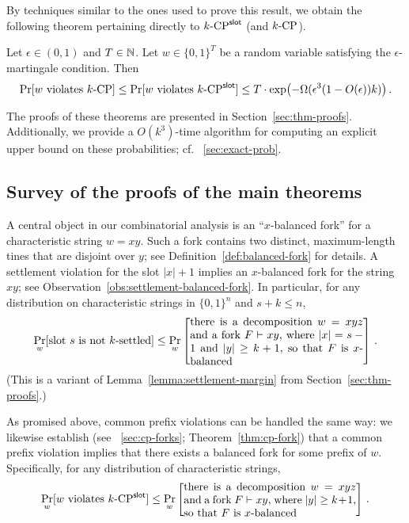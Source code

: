 By techniques similar to the ones used to prove this result, 
we obtain the following theorem pertaining
directly to ${k}\text{-}\mathrm{CP}^{\mathsf{slot}}$ (and ${k}\text{-}\mathrm{CP}$).
\begin{theorem} \label{thm:main-CP} Let
  $\epsilon \in (0,1)$ and $T \in \mathbb{N}$. Let $w \in \{0,1\}^T$ be a
  random variable satisfying the $\epsilon$-martingale condition.
  Then
  \[
    \Pr[\text{$w$ violates ${k}\text{-}\mathrm{CP}$}] 
      \leq \Pr[\text{$w$ violates ${k}\text{-}\mathrm{CP}^{\mathsf{slot}}$}] 
      \leq T \cdot \exp\bigl(-\Omega(\epsilon^3 (1 - O(\epsilon))k)\bigr)
      \,.
  \]
\end{theorem}
The proofs of these theorems are presented in Section~\ref{sec:thm-proofs}.
Additionally, we provide a $O(k^3)$-time algorithm for 
computing an explicit upper bound on these probabilities; cf. \Section~\ref{sec:exact-prob}.


\subsection{Survey of the proofs of the main theorems}\label{sec:args-survey}
A central object in our combinatorial analysis is an ``$x$-balanced fork'' 
for a characteristic string $w = xy$. 
Such a fork contains two distinct, %
maximum-length tines 
that are disjoint over $y$; 
see Definition~\ref{def:balanced-fork} for details. 
A settlement violation for the slot $|x| + 1$ implies an $x$-balanced fork for the string $xy$; 
see Observation~\ref{obs:settlement-balanced-fork}. 
In particular, for any distribution on characteristic strings in $\{0,1\}^n$ and
$s + k \leq n$,
\[
  \Pr_{w}[\text{slot $s$ is not $k$-settled} ] 
    \leq
    \Pr_w\left[\parbox{55mm}{
      there is a decomposition $w = xyz$ and a fork $F \Fork xy$, 
      where $|x| = s - 1$ and $|y| \geq k + 1$, 
      so that $F$ is $x$-balanced
    }\right] 
    \,.
\]
(This is a variant of Lemma~\ref{lemma:settlement-margin} from Section~\ref{sec:thm-proofs}.)

As promised above, common prefix violations can be handled the same
way: we likewise establish (see \Section~\ref{sec:cp-forks}; Theorem~\ref{thm:cp-fork}) that a common
prefix violation implies that there exists a balanced fork for some prefix of
$w$.  Specifically, for any distribution of characteristic strings, 
\begin{equation}\label{eq:pr-cp-fork}
  \Pr_w[\text{$w$ violates $\kSlotCP$}] 
    \leq 
    \Pr_{w}\left[\parbox{55mm}{
      there is a decomposition $w = xyz$ and a fork $F \Fork xy$, 
      where $|y| \geq k + 1$, 
      so that $F$ is $x$-balanced
    }\right] 
    \,. 
\end{equation}

